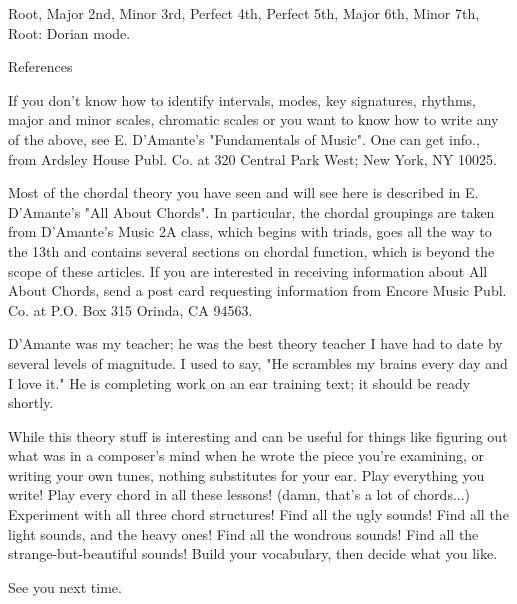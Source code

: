 Root, Major 2nd, Minor 3rd, Perfect 4th, Perfect 5th,
Major 6th, Minor 7th, Root:
Dorian mode.

References

If you don't know how to identify intervals, modes, key signatures,
rhythms, major and minor scales, chromatic scales or you want to know
how to write any of the above, see E. D'Amante's "Fundamentals of Music".
One can get info., from Ardsley House Publ. Co. at 320 Central Park West;
New York, NY 10025.

Most of the chordal theory you have seen and will see here is described 
in E. D'Amante's "All About Chords". In particular, the chordal groupings
are taken from D'Amante's Music 2A class, which begins with triads, goes
all the way to the 13th and contains several sections on chordal function,
which is beyond the scope of these articles. If you are interested in
receiving information about All About Chords, send a post card requesting
information from Encore Music Publ. Co. at P.O. Box 315 Orinda, CA 94563.

D'Amante was my teacher; he was the best theory teacher I have had to
date by several levels of magnitude. I used to say, "He scrambles my
brains every day and I love it." He is completing work on an ear training
text; it should be ready shortly.

While this theory stuff is interesting and can be useful for things like
figuring out what was in a composer's mind when he wrote the piece you're
examining, or writing your own tunes, nothing substitutes for your ear.
Play everything you write! Play every chord in all these lessons! (damn,
that's a lot of chords...) Experiment with all three chord structures!
Find all the ugly sounds! Find all the light sounds, and the heavy ones!
Find all the wondrous sounds! Find all the strange-but-beautiful sounds!
Build your vocabulary, then decide what you like.

See you next time.

